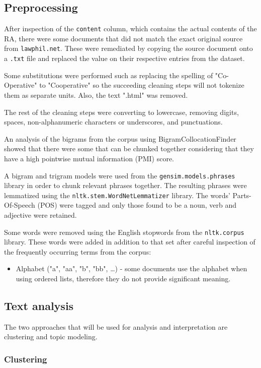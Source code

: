 \documentclass[conference]{IEEEtran}
\begin{document}
\subsection{Preprocessing}
After inspection of the \texttt{content} column, which contains the actual contents of the RA, there were some documents that did not match the exact original source from \texttt{lawphil.net}. These were remediated by copying the source document onto a \texttt{.txt} file and replaced the value on their respective entries from the dataset.

Some substitutions were performed such as replacing the spelling of "Co-Operative" to "Cooperative" so the succeeding cleaning steps will not tokenize them as separate units. Also, the text ".html" was removed.

The rest of the cleaning steps were converting to lowercase, removing digits, spaces, non-alphanumeric characters or underscores, and punctuations.

An analysis of the bigrams from the corpus using BigramCollocationFinder showed that there were some that can be chunked together considering that they have a high pointwise mutual information (PMI) score.

A bigram and trigram models were used from the \texttt{gensim.models.phrases} library in order to chunk relevant phrases together. The resulting phrases were lemmatized using the \texttt{nltk.stem.WordNetLemmatizer} library. The words' Parts-Of-Speech (POS) were tagged and only those found to be a noun, verb and adjective were retained.

Some words were removed using the English stopwords from the \texttt{nltk.corpus} library. These words were added in addition to that set after careful inspection of the frequently occurring terms from the corpus:
\begin{itemize}
    \item Alphabet ("a", "aa", "b", "bb", \dots) - some documents use the alphabet when using ordered lists, therefore they do not provide significant meaning.
\end{itemize}

\subsection{Text analysis}
The two approaches that will be used for analysis and interpretation are clustering and topic modeling.

\subsubsection{Clustering}
\end{document}
